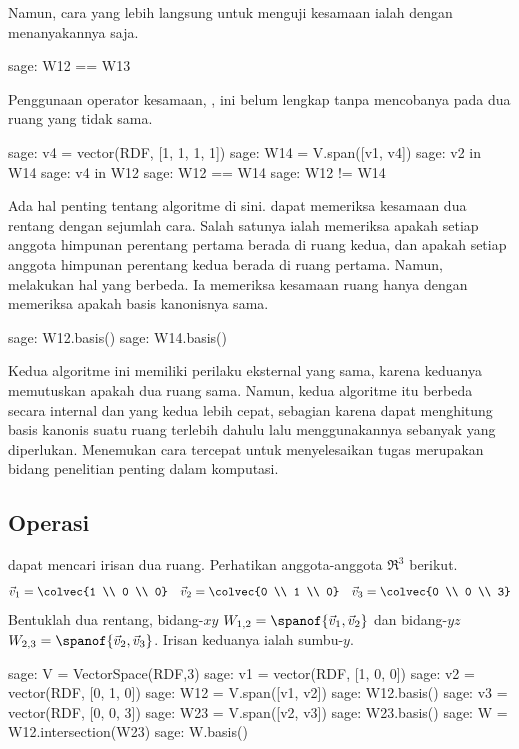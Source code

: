 Namun, cara yang lebih langsung untuk menguji kesamaan ialah dengan menanyakannya saja.
\begin{sagecommandline}
sage: W12 == W13
\end{sagecommandline}
Penggunaan operator kesamaan, \inlinecode{==}, ini 
belum lengkap tanpa mencobanya pada dua ruang yang
tidak sama. 
\begin{sagecommandline}
sage: v4 = vector(RDF, [1, 1, 1, 1])
sage: W14 = V.span([v1, v4])
sage: v2 in W14
sage: v4 in W12
sage: W12 == W14
sage: W12 != W14
\end{sagecommandline}

Ada hal penting tentang algoritme di sini.
\Sage{} dapat memeriksa kesamaan dua rentang dengan sejumlah cara.
Salah satunya ialah memeriksa apakah setiap anggota himpunan perentang pertama berada di
ruang kedua, dan apakah setiap anggota himpunan perentang kedua berada di 
ruang pertama. 
Namun, \Sage{} melakukan hal yang berbeda.
Ia memeriksa kesamaan ruang
hanya dengan memeriksa apakah basis kanonisnya sama.
\begin{sagecommandline}
sage: W12.basis()
sage: W14.basis()
\end{sagecommandline}
Kedua algoritme ini 
memiliki perilaku eksternal yang sama, karena keduanya memutuskan apakah
dua ruang sama.
Namun, kedua algoritme itu berbeda secara internal dan yang kedua lebih cepat, 
sebagian karena \Sage{} dapat menghitung basis kanonis suatu ruang terlebih dahulu
lalu menggunakannya sebanyak yang diperlukan.
Menemukan cara tercepat untuk menyelesaikan tugas merupakan bidang penelitian penting dalam komputasi.


\subsection{Operasi}
\Sage{} dapat mencari irisan dua ruang.
Perhatikan anggota-anggota $\Re^3$ berikut.
\begin{equation*}
  \vec{v}_1=\colvec{1 \\ 0 \\ 0}
  \quad \vec{v}_2=\colvec{0 \\ 1 \\ 0}
  \quad \vec{v}_3=\colvec{0 \\ 0 \\ 3}
\end{equation*}
Bentuklah dua rentang, bidang-$xy$ $W_{1,2}=\spanof{\vec{v}_1, \vec{v}_2}$ 
dan bidang-$yz$ $W_{2,3}=\spanof{\vec{v}_2, \vec{v}_3}$.
Irisan keduanya ialah sumbu-$y$. 
\begin{sagecommandline}
sage: V = VectorSpace(RDF,3)
sage: v1 = vector(RDF, [1, 0, 0])
sage: v2 =  vector(RDF, [0, 1, 0])
sage: W12 = V.span([v1, v2])
sage: W12.basis()
sage: v3 = vector(RDF, [0, 0, 3])
sage: W23 = V.span([v2, v3])
sage: W23.basis()
sage: W = W12.intersection(W23)
sage: W.basis()
\end{sagecommandline}

